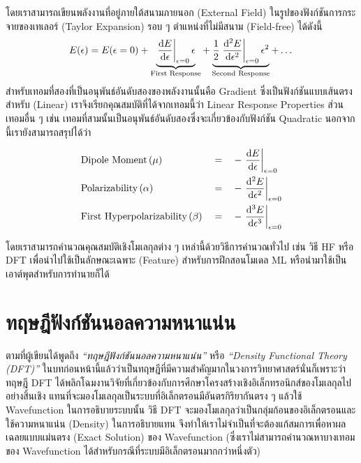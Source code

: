 โดยเราสามารถเขียนพลังงานที่อยู่ภายใต้สนามภายนอก (External Field) ในรูปของฟังก์ชันการกระจายของเทเลอร์ (Taylor Expansion) รอบ ๆ ตำแหน่งที่ไม่มีสนาม (Field-free) ได้ดังนี้
%
\begin{equation}\label{eq:ener_taylor}
    E(\epsilon) = E(\epsilon = 0)
    + \underbrace{\evaluated{\dv{E}{\epsilon}}_{\epsilon = 0} \epsilon}_{\text{First Response}}
    + \underbrace{\frac{1}{2} \evaluated{\dv[2]{E}{\epsilon}}_{\epsilon = 0} \epsilon^{2}}_{\text{Second Response}}
    + \dots
\end{equation}
%
\noindent สำหรับเทอมที่สองที่เป็นอนุพันธ์อันดับสองของพลังงานนั้นคือ Gradient ซึ่งเป็นฟังก์ชันแบบเส้นตรงสำหรับ (Linear) เราจึงเรียกคุณสมบัติที่ได้จากเทอมนี้ว่า Linear Response Properties ส่วนเทอมอื่น ๆ เช่น เทอมที่สามนั้นเป็นอนุพันธ์อันดับสองซึ่งจะเกี่ยวข้องกับฟังก์ชัน Quadratic นอกจากนี้เรายังสามารถสรุปได้ว่า
%
\begin{framed}
    \begin{align*}
         & \text{Dipole Moment}\,(\mu)               &  & = &  & -\evaluated{\dv{E}{\epsilon}}_{\epsilon = 0}    \\
         & \text{Polarizability}\,(\alpha)           &  & = &  & -\evaluated{\dv[2]{E}{\epsilon}}_{\epsilon = 0} \\
         & \text{First Hyperpolarizability}\,(\beta) &  & = &  & -\evaluated{\dv[3]{E}{\epsilon}}_{\epsilon = 0}
    \end{align*}
\end{framed}

โดยเราสามารถคำนวณคุณสมบัติเชิงโมเลกุลต่าง ๆ เหล่านี้ด้วยวิธีการคำนวณทั่วไป เช่น วิธี HF หรือ DFT เพื่อนำไปใช้เป็นลักษณะเฉพาะ (Feature) สำหรับการฝึกสอนโมเดล ML หรือนำมาใช้เป็นเอาต์พุตสำหรับการทำนายก็ได้

\section{ทฤษฎีฟังก์ชันนอลความหนาแน่น}
\label{sec:dft}

ตามที่ผู้เขียนได้พูดถึง \textit{\enquote{ทฤษฎีฟังก์ชันนอลความหนาแน่น}} หรือ \textit{\enquote{Density Functional Theory (DFT)}} ในบทก่อนหน้านี้แล้วว่าเป็นทฤษฎีที่มีความสำคัญมากในวงการวิทยาศาสตร์นั่นก็เพราะว่าทฤษฎี DFT ได้พลิกโฉมงานวิจัยที่เกี่ยวข้องกับการศึกษาโครงสร้างเชิงอิเล็กทรอนิกส์ของโมเลกุลไปอย่างสิ้นเชิง แทนที่จะมองโมเลกุลเป็นระบบที่อิเล็กตรอนมีอันตรกิริยากันตรง ๆ แล้วใช้ Wavefunction ในการอธิบายระบบนั้น วิธี DFT จะมองโมเลกุลว่าเป็นกลุ่มก้อนของอิเล็กตรอนและใช้ความหนาแน่น (Density) ในการอธิบายแทน จึงทำให้เราไม่จำเป็นที่จะต้องแก้สมการเพื่อหาผลเฉลยแบบแม่นตรง (Exact Solution) ของ Wavefunction (ซึ่งเราไม่สามารถคำนวณหาบางเทอมของ Wavefunction ได้สำหรับกรณีที่ระบบมีอิเล็กตรอนมากกว่าหนึ่งตัว)

